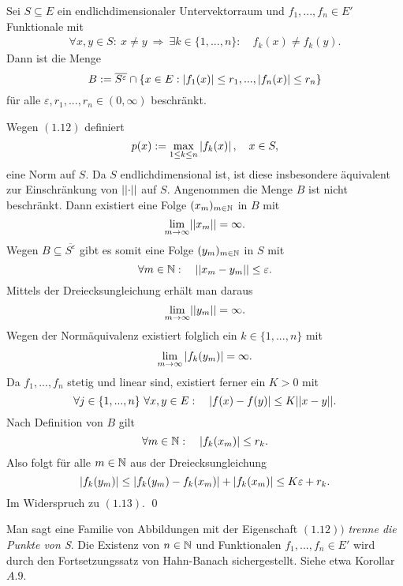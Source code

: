 \begin{lemma}
    Sei $S \subseteq E$ ein endlichdimensionaler Untervektorraum und $f_1,...,f_n \in E'$ Funktionale mit 
    \begin{align}
        \forall x,y \in S: \ x \neq y \ \Rightarrow \ \exists k \in \{1,...,n\}: \quad f_k(x) \neq f_k(y).
    \end{align}
    Dann ist die Menge 
    $$
        B := \overline{S^{\varepsilon}} \cap \{x \in E: \left| f_1(x) \right| \leq r_1,...,\left| f_n(x) \right|\leq r_n\}
    $$
    für alle $\varepsilon, r_1,...,r_n \in (0, \infty)$ beschränkt. 
\end{lemma}

\begin{proof*}
    Wegen $(1.12)$ definiert 
    $$
        p(x) := \max_{1\leq k \leq n} \left| f_k(x) \right|, \quad x \in S,
    $$
    eine Norm auf $S$. Da $S$ endlichdimensional ist, ist diese insbesondere äquivalent zur Einschränkung von $\lvert\lvert \cdot \rvert\rvert$ auf $S$. 
    Angenommen die Menge $B$ ist nicht beschränkt. Dann existiert eine Folge $(x_m)_{m \in \mathbb{N}}$ in $B$ mit 
    $$
        \lim_{m \to \infty} \lvert\lvert x_m \rvert\rvert = \infty. 
    $$
    Wegen $B \subseteq \overline{S^{\varepsilon}}$ gibt es somit eine Folge $(y_m)_{m \in \mathbb{N}}$ in $S$ mit 
    $$
        \forall m \in \mathbb{N}: \quad \lvert\lvert x_m - y_m \rvert\rvert \leq \varepsilon. 
    $$
    Mittels der Dreiecksungleichung erhält man daraus
    $$
        \lim_{m \to \infty}\lvert\lvert y_m \rvert\rvert = \infty. 
    $$
    Wegen der Normäquivalenz existiert folglich ein $k \in \{1,...,n\}$ mit 
    \begin{align}
        \lim_{m \to \infty}\left| f_k(y_m) \right| = \infty. 
    \end{align}
    Da $f_1,...,f_n$ stetig und linear sind, existiert ferner ein $K > 0$ mit 
    $$
        \forall j \in \{1,...,n\} \ \forall x,y \in E: \quad \left| f(x)-f(y) \right| \leq K \lvert\lvert x-y \rvert\rvert. 
    $$
    Nach Definition von $B$ gilt 
    $$
        \forall m \in \mathbb{N}: \quad \left| f_k(x_m) \right| \leq r_k.
    $$
    Also folgt für alle $m \in \mathbb{N}$ aus der Dreiecksungleichung
    $$
        \left| f_k(y_m) \right| \leq \left| f_k(y_m) - f_k(x_m) \right| + \left| f_k(x_m) \right| \leq K \varepsilon + r_k. 
    $$
    Im Widerspruch zu $(1.13)$. \qed
\end{proof*}

\begin{remark}%
    Man sagt eine Familie von Abbildungen mit der Eigenschaft $(1.12))$ \textit{trenne die Punkte von S}.
    Die Existenz von $n \in \mathbb{N}$ und Funktionalen $f_1,...,f_n \in E'$ wird durch den Fortsetzungssatz von Hahn-Banach sichergestellt. Siehe etwa Korollar $A.9$. 
\end{remark}


